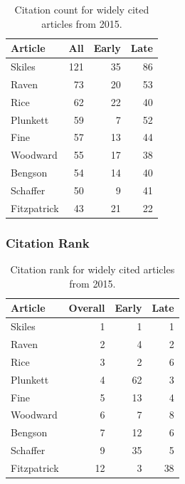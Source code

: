 \documentclass[
  10pt,
  letterpaper,
  DIV=11,
  numbers=noendperiod,
  twoside]{scrartcl}
\begin{document}
\begin{longtable}[]{@{}lrrr@{}}

\caption{\label{tbl-citation-count-2015}Citation count for widely cited
articles from 2015.}

\tabularnewline

\toprule\noalign{}
Article & All & Early & Late \\
\midrule\noalign{}
\endhead
\bottomrule\noalign{}
\endlastfoot
Skiles & 121 & 35 & 86 \\
Raven & 73 & 20 & 53 \\
Rice & 62 & 22 & 40 \\
Plunkett & 59 & 7 & 52 \\
Fine & 57 & 13 & 44 \\
Woodward & 55 & 17 & 38 \\
Bengson & 54 & 14 & 40 \\
Schaffer & 50 & 9 & 41 \\
Fitzpatrick & 43 & 21 & 22 \\

\end{longtable}

\subsubsection*{Citation Rank}\label{sec-rank-2015}

\begin{longtable}[]{@{}lrrr@{}}

\caption{\label{tbl-citation-rank-2015}Citation rank for widely cited
articles from 2015.}

\tabularnewline

\toprule\noalign{}
Article & Overall & Early & Late \\
\midrule\noalign{}
\endhead
\bottomrule\noalign{}
\endlastfoot
Skiles & 1 & 1 & 1 \\
Raven & 2 & 4 & 2 \\
Rice & 3 & 2 & 6 \\
Plunkett & 4 & 62 & 3 \\
Fine & 5 & 13 & 4 \\
Woodward & 6 & 7 & 8 \\
Bengson & 7 & 12 & 6 \\
Schaffer & 9 & 35 & 5 \\
Fitzpatrick & 12 & 3 & 38 \\

\end{longtable}
\end{document}
